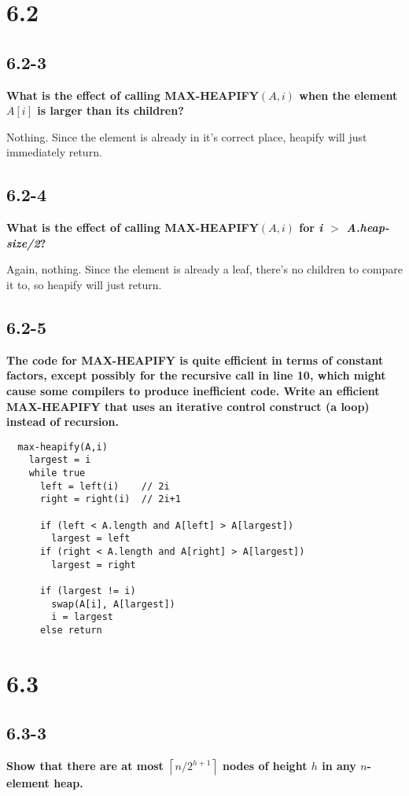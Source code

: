 \documentclass[11pt]{article}
\def\lc{\left\lceil}
\def\rc{\right\rceil}
\begin{document}
 \section*{6.2}
 \subsection*{6.2-3}
  \textbf{What is the effect of calling MAX-HEAPIFY$(A,i)$ when the element $A[i]$ is larger than its 
  children?}

  Nothing.  Since the element is already in it's correct place, heapify will just immediately return.
 \subsection*{6.2-4}
  \textbf{What is the effect of calling MAX-HEAPIFY$(A,i)$ for \textit{i $>$ A.heap-size/2}?}

 Again, nothing.  Since the element is already a leaf, there's no children to compare it to, so heapify
 will just return.
 \subsection*{6.2-5}
  \textbf{The code for MAX-HEAPIFY is quite efficient in terms of constant factors, except possibly 
  for the recursive call in line 10, which might cause some compilers to produce inefficient 
  code. Write an efficient MAX-HEAPIFY that uses an iterative control construct (a loop) 
  instead of recursion.}

  \begin{verbatim}
  max-heapify(A,i)
    largest = i
    while true
      left = left(i)    // 2i
      right = right(i)  // 2i+1
      
      if (left < A.length and A[left] > A[largest])
        largest = left
      if (right < A.length and A[right] > A[largest])
        largest = right

      if (largest != i)
        swap(A[i], A[largest])
        i = largest
      else return
  \end{verbatim}

 \section*{6.3}
 \subsection*{6.3-3}
 \textbf{Show that there are at most $\lc n/2^{h+1} \rc$ nodes of height $h$ in any $n$-element heap.}
 
\end{document}
